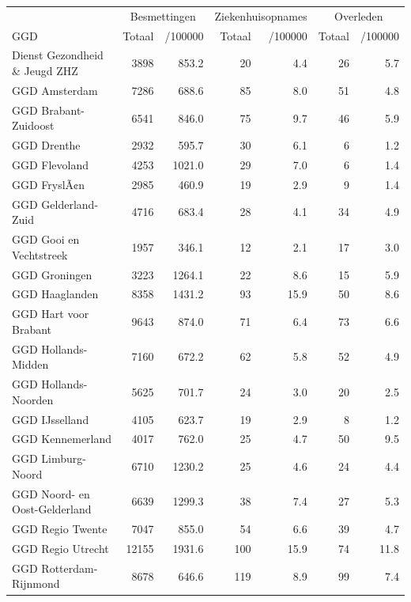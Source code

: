 \documentclass[
  english,
  man,floatsintext]{apa6}
\begin{document}
\begin{table}[H]
\centering\begingroup\fontsize{10}{12}\selectfont

\begin{threeparttable}
\begin{tabular}{lrrrrrr}
\toprule
\multicolumn{1}{c}{ } & \multicolumn{2}{c}{Besmettingen} & \multicolumn{2}{c}{Ziekenhuisopnames} & \multicolumn{2}{c}{Overleden} \\
\cmidrule(l{3pt}r{3pt}){2-3} \cmidrule(l{3pt}r{3pt}){4-5} \cmidrule(l{3pt}r{3pt}){6-7}
GGD & Totaal & /100000 & Totaal & /100000 & Totaal & /100000\\
\midrule
Dienst Gezondheid \& Jeugd ZHZ & 3898 & 853.2 & 20 & 4.4 & 26 & 5.7\\
GGD Amsterdam & 7286 & 688.6 & 85 & 8.0 & 51 & 4.8\\
GGD Brabant-Zuidoost & 6541 & 846.0 & 75 & 9.7 & 46 & 5.9\\
GGD Drenthe & 2932 & 595.7 & 30 & 6.1 & 6 & 1.2\\
GGD Flevoland & 4253 & 1021.0 & 29 & 7.0 & 6 & 1.4\\
GGD FryslÃ¢n & 2985 & 460.9 & 19 & 2.9 & 9 & 1.4\\
GGD Gelderland-Zuid & 4716 & 683.4 & 28 & 4.1 & 34 & 4.9\\
GGD Gooi en Vechtstreek & 1957 & 346.1 & 12 & 2.1 & 17 & 3.0\\
GGD Groningen & 3223 & 1264.1 & 22 & 8.6 & 15 & 5.9\\
GGD Haaglanden & 8358 & 1431.2 & 93 & 15.9 & 50 & 8.6\\
GGD Hart voor Brabant & 9643 & 874.0 & 71 & 6.4 & 73 & 6.6\\
GGD Hollands-Midden & 7160 & 672.2 & 62 & 5.8 & 52 & 4.9\\
GGD Hollands-Noorden & 5625 & 701.7 & 24 & 3.0 & 20 & 2.5\\
GGD IJsselland & 4105 & 623.7 & 19 & 2.9 & 8 & 1.2\\
GGD Kennemerland & 4017 & 762.0 & 25 & 4.7 & 50 & 9.5\\
GGD Limburg-Noord & 6710 & 1230.2 & 25 & 4.6 & 24 & 4.4\\
GGD Noord- en Oost-Gelderland & 6639 & 1299.3 & 38 & 7.4 & 27 & 5.3\\
GGD Regio Twente & 7047 & 855.0 & 54 & 6.6 & 39 & 4.7\\
GGD Regio Utrecht & 12155 & 1931.6 & 100 & 15.9 & 74 & 11.8\\
GGD Rotterdam-Rijnmond & 8678 & 646.6 & 119 & 8.9 & 99 & 7.4\\

\end{tabular}
\end{threeparttable}
\end{table}
\end{document}
